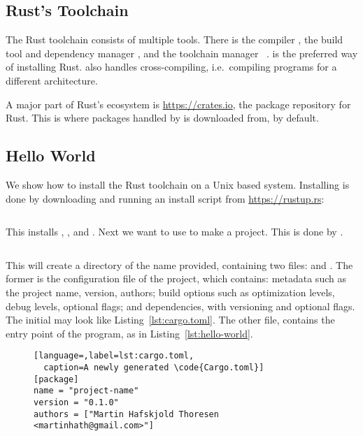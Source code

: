 \documentclass[b5paper]{report}
\begin{document}



\begin{appendices} \chapter{Rust's Toolchain\label{ch:rust-toolchain}} The Rust
  toolchain consists of multiple tools. There is the compiler \rustc{}, the
  build tool and dependency manager \cargo{}, and the toolchain manager
  \rustup~\cite{rustup}. \rustup{} is the preferred way of installing Rust.
  \rustup{} also handles cross-compiling, i.e.\ compiling programs for a
  different architecture.

  A major part of Rust's ecosystem is \url{https://crates.io}, the package repository
  for Rust. This is where packages handled by \cargo{} is downloaded from, by default.

  \section{Hello World}
  We show how to install the Rust toolchain on a Unix based system.
  Installing \rustup{} is done by downloading and running an install script from
  \url{https://rustup.rs}:
  \begin{lstlisting}[language=Bash,numbers=none]
% curl https://sh.rustup.rs -sSf | sh
  \end{lstlisting}
  This installs \rustup{}, \cargo{}, and \rustc{}.
  Next we want to use \cargo{} to make a project. This is done by .
  \begin{lstlisting}[language=Bash,numbers=none]
% cargo init --bin <name-of-project>
  \end{lstlisting}
  This will create a directory of the name provided, containing two files:
   and .
  The former is the configuration file of the project, which contains:
  metadata such as the project name, version, authors;
  build options such as optimization levels, debug levels, optional flags;
  and dependencies, with versioning and optional flags.
  The initial  may look like Listing~\ref{lst:cargo.toml}.
  The other file,  contains the entry point of the program, as
  in Listing~\ref{lst:hello-world}.
  \clearpage{}

  \begin{figure}[ht]
  \begin{lstlisting}[language=,label=lst:cargo.toml,
  caption=A newly generated \code{Cargo.toml}]
[package]
name = "project-name"
version = "0.1.0"
authors = ["Martin Hafskjold Thoresen <martinhath@gmail.com>"]


\end{lstlisting}
\end{figure}
\end{appendices}
\end{document}
